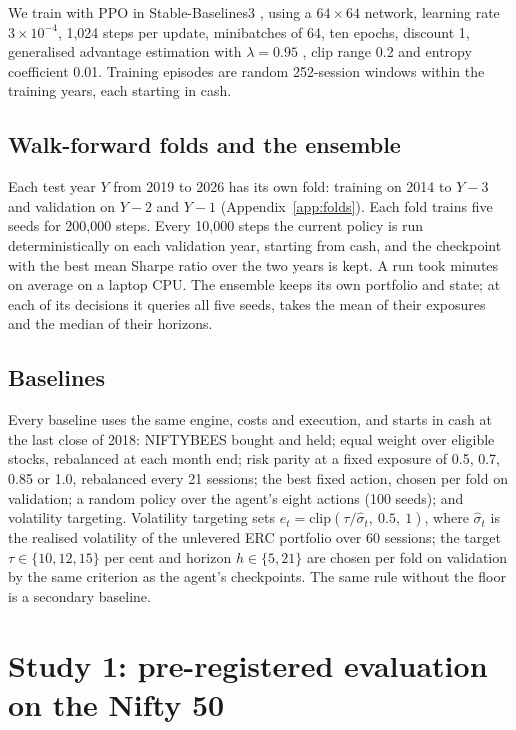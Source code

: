 \documentclass[11pt]{article}
\begin{document}
We train with PPO \citep{schulman2017ppo} in Stable-Baselines3 \citep{raffin2021sb3}, using a $64\times 64$ network, learning rate $3\times 10^{-4}$, 1{,}024 steps per update, minibatches of 64, ten epochs, discount 1, generalised advantage estimation with $\lambda = 0.95$ \citep{schulman2016gae}, clip range 0.2 and entropy coefficient 0.01. Training episodes are random 252-session windows within the training years, each starting in cash.

\subsection{Walk-forward folds and the ensemble}

Each test year $Y$ from 2019 to 2026 has its own fold: training on 2014 to $Y-3$ and validation on $Y-2$ and $Y-1$ (Appendix~\ref{app:folds}). Each fold trains five seeds for 200{,}000 steps. Every 10{,}000 steps the current policy is run deterministically on each validation year, starting from cash, and the checkpoint with the best mean Sharpe ratio over the two years is kept. A run took \RunMinutesMean{} minutes on average on a laptop CPU. The ensemble keeps its own portfolio and state; at each of its decisions it queries all five seeds, takes the mean of their exposures and the median of their horizons.

\subsection{Baselines}

Every baseline uses the same engine, costs and execution, and starts in cash at the last close of 2018:
NIFTYBEES bought and held;
equal weight over eligible stocks, rebalanced at each month end;
risk parity at a fixed exposure of 0.5, 0.7, 0.85 or 1.0, rebalanced every 21 sessions;
the best fixed action, chosen per fold on validation;
a random policy over the agent's eight actions (100 seeds); and
volatility targeting. Volatility targeting sets $e_t = \mathrm{clip}(\tau/\hat\sigma_t,\ 0.5,\ 1)$, where $\hat\sigma_t$ is the realised volatility of the unlevered ERC portfolio over 60 sessions; the target $\tau \in \{10, 12, 15\}$ per cent and horizon $h \in \{5, 21\}$ are chosen per fold on validation by the same criterion as the agent's checkpoints. The same rule without the floor is a secondary baseline.

\section{Study 1: pre-registered evaluation on the Nifty 50}\label{sec:protocol}
\end{document}
